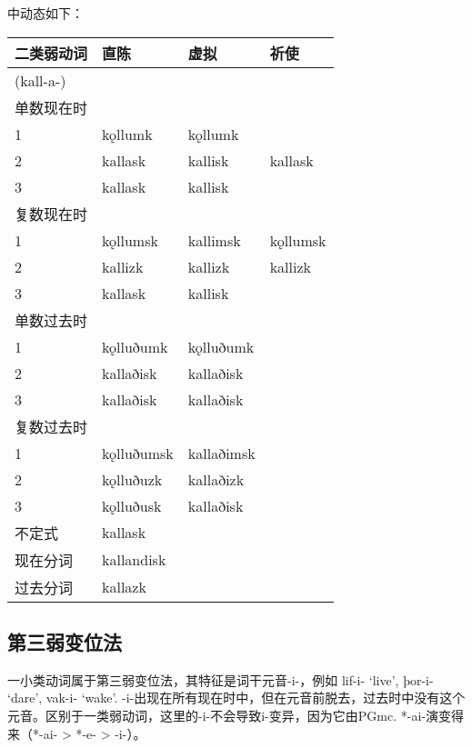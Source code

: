 中动态如下：

\begin{longtable}{llll}
    \toprule
    二类弱动词     & 直陈         & 虚拟         & 祈使       \\
    \midrule
    \endhead
    \bottomrule
    \endfoot
    (kall-a-) &            &            &          \\
    单数现在时     &            &            &          \\
    1         & kǫllumk    & kǫllumk    &          \\
    2         & kallask    & kallisk    & kallask  \\
    3         & kallask    & kallisk    &          \\
    复数现在时     &            &            &          \\
    1         & kǫllumsk   & kallimsk   & kǫllumsk \\
    2         & kallizk    & kallizk    & kallizk  \\
    3         & kallask    & kallisk    &          \\
    单数过去时     &            &            &          \\
    1         & kǫlluðumk  & kǫlluðumk  &          \\
    2         & kallaðisk  & kallaðisk  &          \\
    3         & kallaðisk  & kallaðisk  &          \\
    复数过去时     &            &            &          \\
    1         & kǫlluðumsk & kallaðimsk &          \\
    2         & kǫlluðuzk  & kallaðizk  &          \\
    3         & kǫlluðusk  & kallaðisk  &          \\
    不定式       & kallask    &            &          \\
    现在分词      & kallandisk &            &          \\
    过去分词      & kallazk    &            &          \\
\end{longtable}

\subsection{第三弱变位法}\label{第三弱变位法}

一小类动词属于第三弱变位法，其特征是词干元音-i-，例如 lif-i- `live‌', þor-i- `dare‌', vak-i- `wake‌'.
-i-出现在所有现在时中，但在元音前脱去，过去时中没有这个元音。区别于一类弱动词，这里的-i-不会导致i-变异，因为它由PGmc. *-ai-演变得来（*-ai- > *-e- > -i-）。

